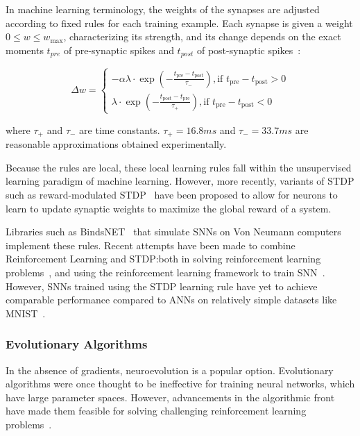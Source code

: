 \documentclass[fyp]{socreport}
\begin{document}
In machine learning terminology, the weights of the synapses are adjusted
according to fixed rules for each training example. Each synapse is given a
weight \(0 \le w \le w_{\max}\), characterizing its strength, and its change
depends on the exact moments \(t_{pre}\) of pre-synaptic spikes and \(t_{post}\)
of post-synaptic spikes~\cite{sboev18_spikin_neural_networ_reinf_learn}:

\begin{equation}
  \Delta w=\left\{\begin{array}{l}{
                    -\alpha \lambda \cdot \exp \left(-\frac{t_{\mathrm{pre}}-t_{\mathrm{post}}}{\tau_{-}}\right),
                    \text {if } t_{\mathrm{pre}}-t_{\mathrm{post}}>0} \\
                    {\lambda \cdot \exp \left(-\frac{t_{\mathrm{post}}-t_{\mathrm{pre}}}{\tau_{+}}\right),
                    \text {if } t_{\mathrm{pre}}-t_{\mathrm{post}}<0}
                  \end{array}\right.
\end{equation}

where \(\tau_{+}\) and \(\tau_{-}\) are time constants. \(\tau_{+} = 16.8ms\)
and \(\tau_{-} = 33.7ms\) are reasonable approximations obtained experimentally.

Because the rules are local, these local learning rules fall within the
unsupervised learning paradigm of machine learning. However, more recently,
variants of STDP such as reward-modulated
STDP~\cite{legenstein08_learn_theor_rewar_modul_spike} have been proposed to
allow for neurons to learn to update synaptic weights to maximize the global
reward of a system.

Libraries such as BindsNET~\cite{10.3389/fninf.2018.00089} that simulate SNNs on
Von Neumann computers implement these rules. Recent attempts have been made to
combine Reinforcement Learning and STDP:\@ both in solving reinforcement
learning problems~\cite{10.3389/fninf.2018.00089}, and using the reinforcement
learning framework to train
SNN~\cite{10.3389/fnbot.2019.00018,10.3389/fnins.2018.00435}. However, SNNs
trained using the STDP learning rule have yet to achieve comparable performance
compared to ANNs on relatively simple datasets like MNIST~\cite{TAVANAEI201947}.

\subsubsection{Evolutionary Algorithms}

In the absence of gradients, neuroevolution is a popular option. Evolutionary
algorithms were once thought to be ineffective for training neural networks,
which have large parameter spaces. However, advancements in the algorithmic
front have made them feasible for solving challenging reinforcement learning
problems~\cite{such17_deep_neuroev}.
\end{document}
